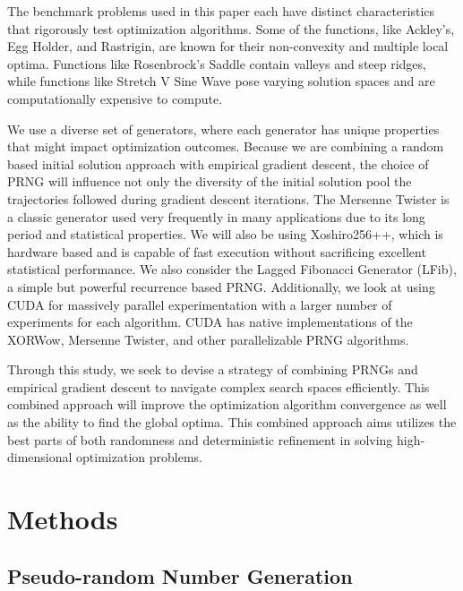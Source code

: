 \documentclass{article}
\begin{document}
        The benchmark problems used in this paper each have distinct characteristics that rigorously test optimization algorithms. Some of the functions, like Ackley’s, Egg Holder, and Rastrigin, are known for their non-convexity and multiple local optima. Functions like Rosenbrock’s Saddle contain valleys and steep ridges, while functions like Stretch V Sine Wave pose varying solution spaces and are computationally expensive to compute.

        We use a diverse set of generators, where each generator has unique properties that might impact optimization outcomes. Because we are combining a random based initial solution approach with empirical gradient descent, the choice of PRNG will influence not only the diversity of the initial solution pool the trajectories followed during gradient descent iterations. The Mersenne Twister is a classic generator used very frequently in many applications due to its long period and statistical properties. We will also be using Xoshiro256++, which is hardware based and is capable of fast execution without sacrificing excellent statistical performance. We also consider the Lagged Fibonacci Generator (LFib), a simple but powerful recurrence based PRNG. Additionally, we look at using CUDA for massively parallel experimentation with a larger number of experiments for each algorithm. CUDA has native implementations of the XORWow, Mersenne Twister, and other parallelizable PRNG algorithms.

        Through this study, we seek to devise a strategy of combining PRNGs and empirical gradient descent to navigate complex search spaces efficiently. This combined approach will improve the optimization algorithm convergence as well as the ability to find the global optima. This combined approach aims utilizes the best parts of both randomness and deterministic refinement in solving high-dimensional optimization problems.

\pagebreak
    \section{Methods}

        \subsection{Pseudo-random Number Generation}
\end{document}
